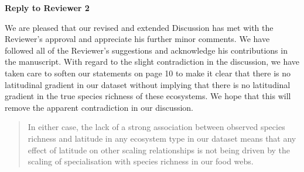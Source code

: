 \documentclass[12pt]{letter}
\begin{document}
{\Large \bf Reply to Reviewer 2}

  We are pleased that our revised and extended Discussion has met with the Reviewer's approval and appreciate his further minor comments. We have followed all of the Reviewer's suggestions and acknowledge his contributions in the manuscript. With regard to the slight contradiction in the discussion, we have taken care to soften our statements on page 10 to make it clear that there is no latitudinal gradient in our dataset without implying that there is no latitudinal gradient in the true species richness of these ecosystems. We hope that this will remove the apparent contradiction in our discussion.


  \begin{quotation} 
  In either case, the lack of a strong association
  between observed species richness and latitude in any ecosystem type in our dataset
  means that any effect of latitude on other scaling relationships is not being driven by
  the scaling of specialisation with species richness in our food webs.
  \end{quotation}
\end{document}

